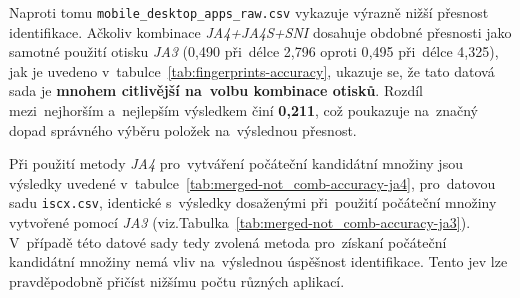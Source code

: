 Naproti tomu \texttt{mobile\_desktop\_apps\_raw.csv} vykazuje výrazně nižší přesnost identifikace. Ačkoliv kombinace \textit{JA4+JA4S+SNI} dosahuje obdobné přesnosti jako samotné použití otisku \textit{JA3} (0{,}490 při~délce 2{,}796 oproti 0{,}495 při~délce 4{,}325), jak je uvedeno v~tabulce~\ref{tab:fingerprints-accuracy}, ukazuje se, že tato datová sada je \textbf{mnohem citlivější na~volbu kombinace otisků}. Rozdíl mezi~nejhorším a~nejlepším výsledkem činí \textbf{0{,}211}, což poukazuje na~značný dopad správného výběru položek na~výslednou přesnost.

Při použití metody \textit{JA4} pro~vytváření počáteční kandidátní množiny jsou výsledky uvedené v~tabulce~\ref{tab:merged-not_comb-accuracy-ja4}, pro~datovou sadu \texttt{iscx.csv}, identické s~výsledky dosaženými při~použití počáteční množiny vytvořené pomocí \textit{JA3} (viz.Tabulka~\ref{tab:merged-not_comb-accuracy-ja3}). V~případě této datové sady tedy zvolená metoda pro~získaní počáteční kandidátní množiny nemá vliv na~výslednou úspěšnost identifikace. Tento jev lze pravděpodobně přičíst nižšímu počtu různých aplikací.

